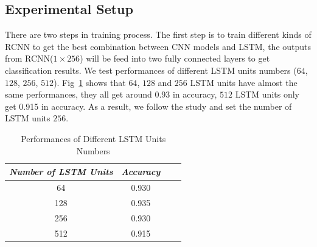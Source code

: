 \documentclass[journal]{IEEEtran}
\begin{document}
\subsection{Experimental Setup}
\label{experimentalsetup}
There are two steps in training process.
The first step is to train different kinds of RCNN to get the best combination between CNN models and LSTM, the outputs from RCNN($1 \times 256$) will be feed into two fully connected layers to get classification results. 
We test performances of different LSTM units numbers ($64$, $128$, $256$, $512$). Fig~\ref{lstmunit} shows that $64$, $128$ and $256$ LSTM units have almost the same performances, they all get around 0.93 in accuracy, $512$ LSTM units only get 0.915 in accuracy. As a result, we follow the study \cite{Donahue2015Long} and set the number of LSTM units $256$.
\begin{table}[htb]
    \vspace{-0cm}
    \caption{Performances of Different LSTM Units Numbers}
    \vspace{-0cm}
    \begin{center}
    \begin{tabular}{|c|c|c|c|}
    \hline
    \textbf{\textit{Number of LSTM Units}} & \textbf{\textit{Accuracy}}\\
    \hline
    64 & 0.930 \\
    128 & 0.935\\
    256 & 0.930 \\
    512 & 0.915 \\
    
    \hline
    \end{tabular}
    \vspace{-0cm}
    \label{lstmunit}
    \end{center}
    \vspace{-0cm}
    \end{table}
\end{document}

